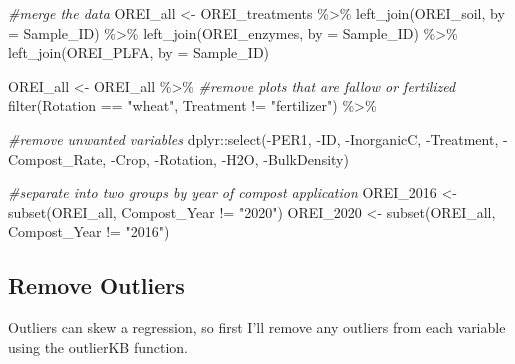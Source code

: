 \documentclass[
]{article}
\newenvironment{Shaded}{\begin{snugshade}}{\end{snugshade}}
\newcommand{\AttributeTok}[1]{\textcolor[rgb]{0.77,0.63,0.00}{#1}}
\newcommand{\CommentTok}[1]{\textcolor[rgb]{0.56,0.35,0.01}{\textit{#1}}}
\newcommand{\FunctionTok}[1]{\textcolor[rgb]{0.00,0.00,0.00}{#1}}
\newcommand{\NormalTok}[1]{#1}
\newcommand{\OtherTok}[1]{\textcolor[rgb]{0.56,0.35,0.01}{#1}}
\newcommand{\SpecialCharTok}[1]{\textcolor[rgb]{0.00,0.00,0.00}{#1}}
\newcommand{\StringTok}[1]{\textcolor[rgb]{0.31,0.60,0.02}{#1}}
\begin{document}
\begin{Shaded}
\begin{Highlighting}[]
\CommentTok{\#merge the data}
\NormalTok{OREI\_all }\OtherTok{\textless{}{-}}\NormalTok{ OREI\_treatments }\SpecialCharTok{\%\textgreater{}\%} 
  \FunctionTok{left\_join}\NormalTok{(OREI\_soil, }\AttributeTok{by =} \StringTok{\textquotesingle{}Sample\_ID\textquotesingle{}}\NormalTok{) }\SpecialCharTok{\%\textgreater{}\%} 
  \FunctionTok{left\_join}\NormalTok{(OREI\_enzymes, }\AttributeTok{by =} \StringTok{\textquotesingle{}Sample\_ID\textquotesingle{}}\NormalTok{) }\SpecialCharTok{\%\textgreater{}\%} 
  \FunctionTok{left\_join}\NormalTok{(OREI\_PLFA, }\AttributeTok{by =} \StringTok{\textquotesingle{}Sample\_ID\textquotesingle{}}\NormalTok{)}

\NormalTok{OREI\_all }\OtherTok{\textless{}{-}}\NormalTok{ OREI\_all }\SpecialCharTok{\%\textgreater{}\%} 
\CommentTok{\#remove plots that are fallow or fertilized}
  \FunctionTok{filter}\NormalTok{(Rotation }\SpecialCharTok{==} \StringTok{"wheat"}\NormalTok{, Treatment }\SpecialCharTok{!=} \StringTok{"fertilizer"}\NormalTok{) }\SpecialCharTok{\%\textgreater{}\%} 
  
\CommentTok{\#remove unwanted variables}
\NormalTok{ dplyr}\SpecialCharTok{::}\FunctionTok{select}\NormalTok{(}\SpecialCharTok{{-}}\NormalTok{PER1, }\SpecialCharTok{{-}}\NormalTok{ID, }\SpecialCharTok{{-}}\NormalTok{InorganicC, }\SpecialCharTok{{-}}\NormalTok{Treatment, }\SpecialCharTok{{-}}\NormalTok{Compost\_Rate, }
         \SpecialCharTok{{-}}\NormalTok{Crop, }\SpecialCharTok{{-}}\NormalTok{Rotation, }\SpecialCharTok{{-}}\NormalTok{H2O, }\SpecialCharTok{{-}}\NormalTok{BulkDensity) }

\CommentTok{\#separate into two groups by year of compost application}
\NormalTok{OREI\_2016 }\OtherTok{\textless{}{-}} \FunctionTok{subset}\NormalTok{(OREI\_all, Compost\_Year }\SpecialCharTok{!=} \StringTok{"2020"}\NormalTok{)}
\NormalTok{OREI\_2020 }\OtherTok{\textless{}{-}} \FunctionTok{subset}\NormalTok{(OREI\_all, Compost\_Year }\SpecialCharTok{!=} \StringTok{"2016"}\NormalTok{)}
\end{Highlighting}
\end{Shaded}

\hypertarget{remove-outliers}{%
\subsection{Remove Outliers}\label{remove-outliers}}

Outliers can skew a regression, so first I'll remove any outliers from
each variable using the outlierKB function.
\end{document}
